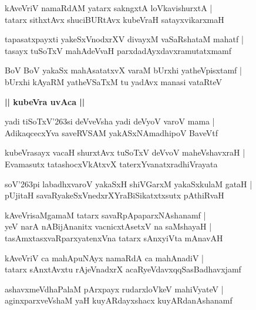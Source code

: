 \documentclass[twoside,12pt,openright]{book}
\def\S{\char'263}
\newcounter{shloka}[chapter]
\def\uvaca#1{\centerline{{\large\textbf{#1}}}}
\begin{document}
\begin{shloka}
kAveVriV namaRdAM yatarx sakngxtA loVkavishurxtA |\\
tatarx sithxtAvx shuciBURtAvx kubeVraH satayxvikarxmaH 
\end{shloka}

\begin{shloka}
tapasatxpayxti yakeSxVnodxrXV divayxM vaSaRshataM mahatf |\\
tasayx tuSoTxV mahAdeVvaH parxdadAyxdavxramutatxmamf
\end{shloka}

\begin{shloka}
BoV BoV yakaSx mahAsatatxvX varaM bUrxhi yatheVpisxtamf |\\
bUrxhi kAyaRM yatheVSaTxM tu yadAvx manasi vataRteV 
\end{shloka}


\uvaca{|| kubeVra uvAca ||}

\begin{shloka}
yadi tiSoTxV\S si deVveVsha yadi deVyoV varoV mama |\\
AdikaqcecxYva saveRVSAM yakASxNAmadhipoV BaveVtf 
\end{shloka}

\begin{shloka}
kubeVrasayx vacaH shurxtAvx tuSoTxV deVvoV maheVshavxraH |\\
Evamasutx tatashocxVkAtxvX taterxYvanatxradhiVrayata
\end{shloka}

\begin{shloka}
soV\S pi labadhxvaroV yakaSxH shiVGarxM yakaSxkulaM gataH |\\
pUjitaH savaRyakeSxVnedxrXYraBiSikatxtxsutx pAthiRvaH 
\end{shloka}

\begin{shloka}
kAveVrisaMgamaM tatarx savaRpApaparxNAshanamf |\\
yeV narA nABijAnanitx vacnicxtAsetxV na saMshayaH |\\
tasAmxtasxvaRparxyatenxVna tatarx sAnxyiVta mAnavAH 
\end{shloka}

\begin{shloka}
kAveVriV ca mahApuNAyx namaRdA ca mahAnadiV |\\
tatarx sAnxtAvxtu rAjeVnadxrX acaRyeVdavxqqSasBadhavxjamf 
\end{shloka}

\begin{shloka}
ashavxmeVdhaPalaM pArxpayx rudarxloVkeV mahiVyateV |\\
aginxparxveVshaM yaH kuyARdayxshacx kuyARdanAshanamf
\end{shloka}
\end{document}
